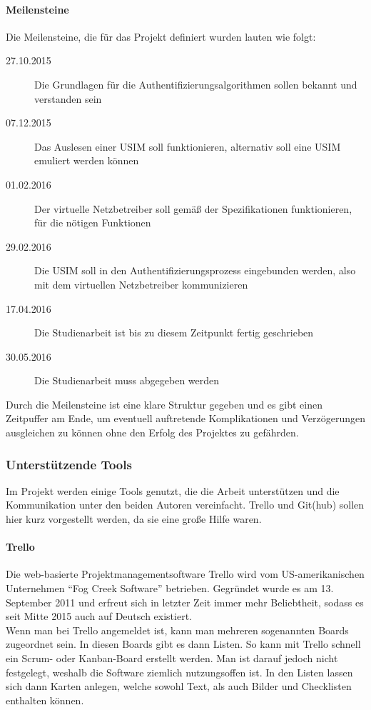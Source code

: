  \paragraph{Meilensteine} Die Meilensteine, die für das Projekt definiert wurden lauten wie folgt:
 \begin{description}
 \item [27.10.2015] Die Grundlagen für die Authentifizierungs\-algorithmen sollen bekannt und verstanden sein
 \item [07.12.2015] Das Auslesen einer USIM soll funktionieren, alternativ soll eine USIM emuliert werden können
 \item [01.02.2016] Der virtuelle Netzbetreiber soll gemäß der Spezifikationen funktionieren, für die nötigen Funktionen
 \item [29.02.2016] Die USIM soll in den Authentifizierungsprozess eingebunden werden, also mit dem virtuellen Netzbetreiber kommunizieren
 \item [17.04.2016] Die Studienarbeit ist bis zu diesem Zeitpunkt fertig geschrieben
 \item [30.05.2016] Die Studienarbeit muss abgegeben werden
 \end{description}
 
 Durch die Meilensteine ist eine klare Struktur gegeben und es gibt einen Zeitpuffer am Ende,
 um eventuell auftretende Komplikationen und Verzögerungen ausgleichen zu können ohne den
 Erfolg des Projektes zu gefährden.

 \subsubsection{Unterstützende Tools}
  Im Projekt werden einige Tools genutzt, die die Arbeit unterstützen und die Kommunikation
  unter den beiden Autoren vereinfacht. Trello und Git(hub) sollen hier kurz vorgestellt werden,
  da sie eine große Hilfe waren.

  \paragraph{Trello}
  Die web-basierte Projekt\-management\-software Trello wird vom US-amerikanischen Unternehmen
  ``Fog Creek Software'' betrieben. Gegründet wurde es am 13. September 2011 und erfreut sich  in
  letzter Zeit immer mehr Beliebtheit, sodass es seit Mitte 2015 auch auf Deutsch existiert. \\
  Wenn man bei Trello angemeldet ist, kann man mehreren sogenannten Boards zugeordnet sein. In
  diesen Boards gibt es dann Listen. So kann mit Trello schnell ein Scrum- oder Kanban-Board
  erstellt werden. Man ist darauf jedoch nicht festgelegt, weshalb die Software ziemlich
  nutzungsoffen ist. In den Listen lassen sich dann Karten anlegen, welche sowohl Text, als auch
  Bilder und Checklisten enthalten können.

